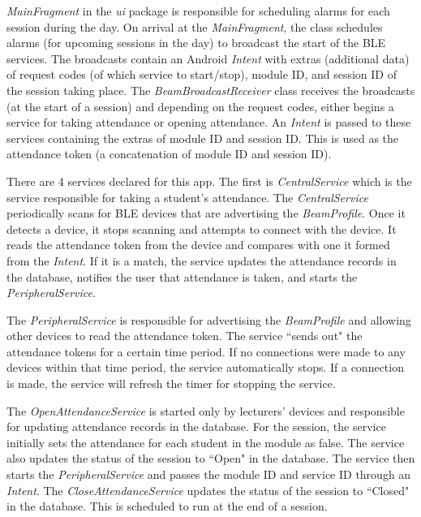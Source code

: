 \documentclass[../report.tex]{subfiles}
\begin{document}
\textit{MainFragment} in the \textit{ui} package is responsible for scheduling alarms for each session during the day. On arrival at the \textit{MainFragment}, the class schedules alarms (for upcoming sessions in the day) to broadcast the start of the BLE services. The broadcasts contain an Android \textit{Intent} with extras (additional data) of request codes (of which service to start/stop), module ID, and session ID of the session taking place. The \textit{BeamBroadcastReceiver} class receives the broadcasts (at the start of a session) and depending on the request codes, either begins a service for taking attendance or opening attendance. An \textit{Intent} is passed to these services containing the extras of module ID and session ID. This is used as the attendance token (a concatenation of module ID and session ID).

There are 4 services declared for this app. The first is \textit{CentralService} which is the service responsible for taking a student’s attendance. The \textit{CentralService} periodically scans for BLE devices that are advertising the \textit{BeamProfile}. Once it detects a device, it stops scanning and attempts to connect with the device. It reads the attendance token from the device and compares with one it formed from the \textit{Intent}. If it is a match, the service updates the attendance records in the database, notifies the user that attendance is taken, and starts the \textit{PeripheralService}.

The \textit{PeripheralService} is responsible for advertising the \textit{BeamProfile} and allowing other devices to read the attendance token. The service ``sends out" the attendance tokens for a certain time period. If no connections were made to any devices within that time period, the service automatically stops. If a connection is made, the service will refresh the timer for stopping the service.

The \textit{OpenAttendanceService} is started only by lecturers' devices and responsible for updating attendance records in the database. For the session, the service initially sets the attendance for each student in the module as false. The service also updates the status of the session to ``Open" in the database. The service then starts the \textit{PeripheralService} and passes the module ID and service ID through an \textit{Intent}. The \textit{CloseAttendanceService} updates the status of the session to ``Closed" in the database. This is scheduled to run at the end of a session.
\end{document}
